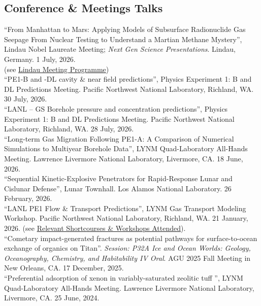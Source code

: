 \documentclass[11pt, letterpaper]{article}
\newcommand{\years}[1]{\marginnote{\scriptsize #1}}
\begin{document}
\subsection*{Conference \& Meetings Talks}
\label{sec:conference-talks}  %
%
\years{2026} ``From Manhattan to Mars: Applying Models of Subsurface
Radionuclide Gas Seepage From Nuclear Testing to Understand a Martian Methane
Mystery'',  Lindau Nobel Laureate Meeting; \textit{Next Gen Science
Presentations}. Lindau, Germany.  1 July, 2026.\\
(see \href{https://www.mediatheque.lindau-nobel.org/meetings/2026/programme/42971}{Lindau Meeting Programme})\\
%
\years{2026} ``PE1-B and -DL cavity \& near field predictions'', Physics Experiment 1: B and DL Predictions Meeting. Pacific Northwest National Laboratory, Richland, WA.  30
July, 2026.\\
%
\years{2026} ``LANL -- GS Borehole pressure and concentration predictions'', Physics Experiment 1: B and DL Predictions Meeting. Pacific Northwest National Laboratory, Richland, WA.  28
July, 2026.\\
%
\years{2026} ``Long-term Gas Migration Following PE1-A: A Comparison of
Numerical Simulations to Multiyear Borehole Data'', LYNM Quad-Laboratory
All-Hands Meeting. Lawrence Livermore National Laboratory, Livermore, CA.  18
June, 2026.\\
%
\years{2026} ``Sequential Kinetic-Explosive Penetrators for 
Rapid-Response Lunar and Cislunar Defense'', 
Lunar Townhall. Los Alamos National Laboratory.
26 February, 2026.\\
%
\years{2026} ``LANL PE1 Flow \& Transport Predictions'', 
LYNM Gas Transport Modeling Workshop. Pacific Northwest National Laboratory, Richland, WA.
21 January, 2026. 
(see \hyperref[sec:shortcourses]{Relevant Shortcourses \& Workshops Attended}).\\
%
\years{2025} ``Cometary impact-generated fractures as potential pathways for
surface-to-ocean exchange of organics on Titan''. \textit{Session: P32A Ice and
Ocean Worlds: Geology, Oceanography, Chemistry, and Habitability IV Oral}. AGU
2025 Fall Meeting in New Orleans, CA. 17 December, 2025.\\
%
\years{2024} ``Preferential adsorption of xenon in variably-saturated zeolitic tuff
'', LYNM Quad-Laboratory All-Hands Meeting. Lawrence Livermore National Laboratory, Livermore, CA.
25 June, 2024.\\
%
\years{2023} 
\end{document}
